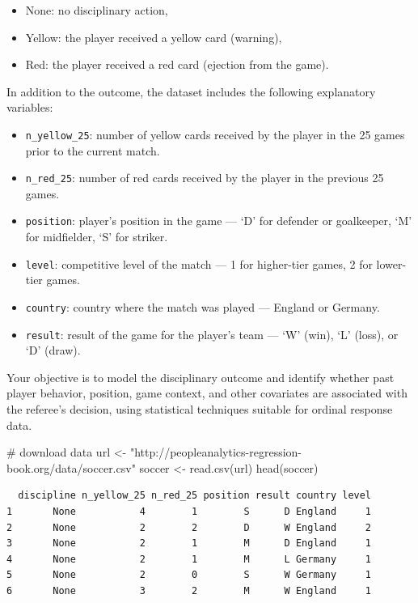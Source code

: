 \documentclass[
  letterpaper,
  DIV=11,
  numbers=noendperiod]{scrartcl}
\newenvironment{Shaded}{\begin{snugshade}}{\end{snugshade}}
\newcommand{\CommentTok}[1]{\textcolor[rgb]{0.37,0.37,0.37}{#1}}
\newcommand{\FunctionTok}[1]{\textcolor[rgb]{0.28,0.35,0.67}{#1}}
\newcommand{\NormalTok}[1]{\textcolor[rgb]{0.00,0.23,0.31}{#1}}
\newcommand{\OtherTok}[1]{\textcolor[rgb]{0.00,0.23,0.31}{#1}}
\newcommand{\StringTok}[1]{\textcolor[rgb]{0.13,0.47,0.30}{#1}}
\begin{document}
\begin{itemize}
\item
  None: no disciplinary action,
\item
  Yellow: the player received a yellow card (warning),
\item
  Red: the player received a red card (ejection from the game).
\end{itemize}

In addition to the outcome, the dataset includes the following
explanatory variables:

\begin{itemize}
\item
  \texttt{n\_yellow\_25}: number of yellow cards received by the player
  in the 25 games prior to the current match.
\item
  \texttt{n\_red\_25}: number of red cards received by the player in the
  previous 25 games.
\item
  \texttt{position}: player's position in the game --- `D' for defender
  or goalkeeper, `M' for midfielder, `S' for striker.
\item
  \texttt{level}: competitive level of the match --- 1 for higher-tier
  games, 2 for lower-tier games.
\item
  \texttt{country}: country where the match was played --- England or
  Germany.
\item
  \texttt{result}: result of the game for the player's team --- `W'
  (win), `L' (loss), or `D' (draw).
\end{itemize}

Your objective is to model the disciplinary outcome and identify whether
past player behavior, position, game context, and other covariates are
associated with the referee's decision, using statistical techniques
suitable for ordinal response data.

\begin{Shaded}
\begin{Highlighting}[]
\CommentTok{\# download data}
\NormalTok{url }\OtherTok{\textless{}{-}} \StringTok{"http://peopleanalytics{-}regression{-}book.org/data/soccer.csv"}
\NormalTok{soccer }\OtherTok{\textless{}{-}} \FunctionTok{read.csv}\NormalTok{(url)}
\FunctionTok{head}\NormalTok{(soccer)}
\end{Highlighting}
\end{Shaded}

\begin{verbatim}
  discipline n_yellow_25 n_red_25 position result country level
1       None           4        1        S      D England     1
2       None           2        2        D      W England     2
3       None           2        1        M      D England     1
4       None           2        1        M      L Germany     1
5       None           2        0        S      W Germany     1
6       None           3        2        M      W England     1
\end{verbatim}
\end{document}
